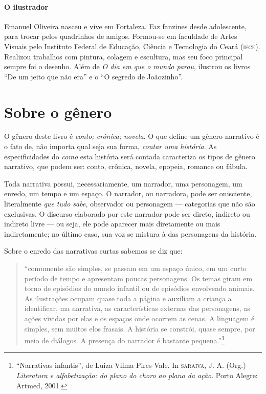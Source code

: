 \documentclass[11pt]{extarticle}
\begin{document}

\paragraph{O ilustrador} Emanuel Oliveira nasceu e vive em Fortaleza. Faz fanzines desde adolescente, para trocar pelos quadrinhos de amigos. Formou-se em faculdade de Artes Visuais pelo Instituto Federal de Educação, Ciência e Tecnologia do Ceará (\textsc{ifce}). Realizou trabalhos com pintura, colagem e escultura, mas seu foco principal sempre foi o desenho. Além de \textit{O dia em que o mundo parou}, ilustrou os livros ``De um jeito que não era'' e o ``O segredo de Joãozinho''.


\section{Sobre o gênero}

O gênero deste livro é \textit{conto; crônica; novela}.
O que define um gênero narrativo é o fato de, não importa qual seja sua forma, \textit{contar uma história}.
As especificidades do \textit{como} esta história será contada caracteriza os tipos de gênero narrativo, que podem ser: conto, crônica, novela, epopeia, romance ou fábula. 

Toda narrativa possui, necessariamente, um narrador, uma personagem, um enredo, um tempo e um espaço. O narrador, ou narradora, pode ser onisciente, literalmente \textit{que tudo sabe}, observador ou personagem --- categorias que não são exclusivas. O discurso elaborado por este narrador pode ser direto, indireto ou indireto livre --- ou seja, ele pode aparecer mais diretamente ou mais indiretamente; no último caso, sua voz se mistura à das personagens da história.

Sobre o enredo das narrativas curtas sabemos se diz que:

\begin{quote}
``comumente são simples, se passam em um espaço único, em um curto período de tempo e apresentam poucas personagens. Os temas giram em torno de episódios do mundo infantil ou de episódios envolvendo animais. As ilustrações ocupam quase toda a página e auxiliam 
a criança a identificar, ma narrativa, as características externas das personagens, as ações vividas por elas e os espaços onde ocorrem as cenas. A linguagem é simples, sem muitos elos frasais. A história se constrói, quase sempre, por meio de diálogos. A presença do narrador é bastante pequena.''\footnote{“Narrativas infantis”, de Luiza Vilma Pires Vale. In \textsc{saraiva}, J. A. (Org.) \textit{Literatura e alfabetização: do plano do choro ao plano da ação}. Porto Alegre: Artmed, 2001.}  
\end{quote}
\end{document}
